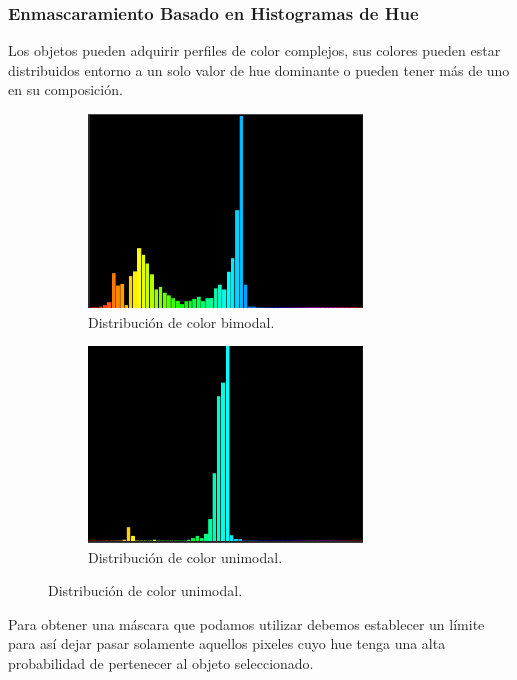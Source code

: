 \subsubsection{Enmascaramiento Basado en Histogramas de Hue}
Los objetos pueden adquirir perfiles de color complejos, sus colores pueden estar distribuidos entorno a un solo valor de hue dominante o pueden tener más de uno en su composición. 
\begin{figure}[H]
	\centering
	\begin{subfigure}{.4\textwidth}
		\centering
		\includegraphics[width=0.8\textwidth]{Imagenes/camshift_hist_bimodal.PNG}
		\caption{Distribución de color bimodal.}
		\label{fig:bimodal}
	\end{subfigure}
	
	\begin{subfigure}{.4\textwidth}
		\centering
		\includegraphics[width=0.8\textwidth]{Imagenes/camshift_hist_unimodal.PNG}
		\caption{Distribución de color unimodal.}
		\label{fig:unimodal}
	\end{subfigure}

\end{figure}
Para obtener una máscara que podamos utilizar debemos establecer un límite para así dejar pasar solamente aquellos pixeles cuyo hue tenga una alta probabilidad de pertenecer al objeto seleccionado. 

